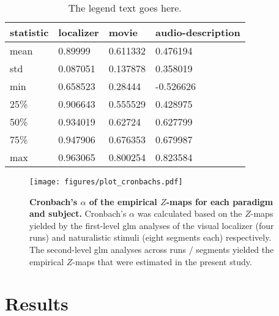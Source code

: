 \begin{table*}[btp]
\centering
    \caption{
    \textbf{Descriptive statistics of Cronbach's $\alpha$ across subjects.}
    Imo, not super necessary to provide these numbers. Stripplot + boxplots
    could be sufficient. If table is supposed to be kept, round the numbers,
    write a good description for the table.}
\label{tab:cronbachs}
\begin{tabular}{llll}
    \toprule
    \textbf{statistic} & \textbf{localizer} & \textbf{movie} & \textbf{audio-description} \\
    \midrule
    mean & 0.89999 & 0.611332 & 0.476194 \tabularnewline
    std & 0.087051 & 0.137878 & 0.358019 \tabularnewline
    min & 0.658523 & 0.28444 & -0.526626 \tabularnewline
    25\% & 0.906643 & 0.555529 & 0.428975 \tabularnewline
    50\% & 0.934019 & 0.62724 & 0.627799 \tabularnewline
    75\% & 0.947906 & 0.676353 & 0.679987 \tabularnewline
    max & 0.963065 & 0.800254 & 0.823584 \tabularnewline
    \bottomrule
\end{tabular}
\caption*{The legend text goes here.}
\end{table*}


\begin{figure*}[tbp] \centering
    \texttt{[image: figures/plot\_cronbachs.pdf]}
    \caption{\textbf{Cronbach's $\alpha$ of the empirical $Z$-maps for each
    paradigm and subject.}
    Cronbach's $\alpha$ was calculated based on the $Z$-maps yielded by the
    first-level \ac{glm} analyses of the visual localizer
    \citep{sengupta2016extension} (four runs) and naturalistic stimuli
    \citep{haeusler2022processing} (eight segments each) respectively.
    The second-level \ac{glm} analyses across runs / segments yielded the
    empirical $Z$-maps that were estimated in the present study.
    }
    \label{fig:cronbachs}
\end{figure*}



\pagebreak



\section{Results}



